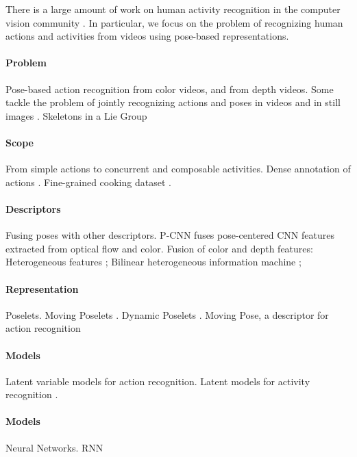 There is a large amount of work on human activity recognition in the computer
vision community . 
In particular, we focus on the problem of recognizing human actions and
activities from videos using pose-based representations.

\paragraph{Problem} Pose-based action recognition from color videos, and
from depth videos.
Some tackle the problem of jointly recognizing actions and poses in videos
\cite{Nie2015} and in still images \cite{Yao2010}.
Skeletons in a Lie Group \cite{Vemulapalli2014}

\paragraph{Scope} From simple actions to concurrent and composable activities.
Dense annotation of actions \cite{Yeung2015}.
Fine-grained cooking dataset \cite{Rohrbach2012}.

\paragraph{Descriptors} Fusing poses with other descriptors. P-CNN \cite{Cheron2015}
fuses pose-centered CNN features extracted from optical flow and color.
Fusion of color and depth features: Heterogeneous features \cite{Hu2015};
Bilinear heterogeneous information machine \cite{Kong2015};

\paragraph{Representation} Poselets.
Moving Poselets \cite{Tao2015}.
Dynamic Poselets \cite{Wang2014}.
Moving Pose, a descriptor for action recognition \cite{Zanfir2013}

\paragraph{Models} Latent variable models for action recognition.
Latent models for activity recognition \cite{Hu2014}.

\paragraph{Models} Neural Networks. RNN \cite{YongDu2015}










